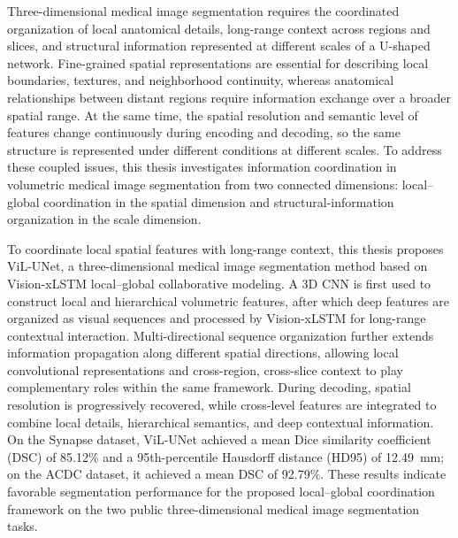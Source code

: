 
Three-dimensional medical image segmentation requires the coordinated organization of local anatomical details, long-range context across regions and slices, and structural information represented at different scales of a U-shaped network. Fine-grained spatial representations are essential for describing local boundaries, textures, and neighborhood continuity, whereas anatomical relationships between distant regions require information exchange over a broader spatial range. At the same time, the spatial resolution and semantic level of features change continuously during encoding and decoding, so the same structure is represented under different conditions at different scales. To address these coupled issues, this thesis investigates information coordination in volumetric medical image segmentation from two connected dimensions: local--global coordination in the spatial dimension and structural-information organization in the scale dimension.

To coordinate local spatial features with long-range context, this thesis proposes ViL-UNet, a three-dimensional medical image segmentation method based on Vision-xLSTM local--global collaborative modeling. A 3D CNN is first used to construct local and hierarchical volumetric features, after which deep features are organized as visual sequences and processed by Vision-xLSTM for long-range contextual interaction. Multi-directional sequence organization further extends information propagation along different spatial directions, allowing local convolutional representations and cross-region, cross-slice context to play complementary roles within the same framework. During decoding, spatial resolution is progressively recovered, while cross-level features are integrated to combine local details, hierarchical semantics, and deep contextual information. On the Synapse dataset, ViL-UNet achieved a mean Dice similarity coefficient (DSC) of 85.12\% and a 95th-percentile Hausdorff distance (HD95) of 12.49~mm; on the ACDC dataset, it achieved a mean DSC of 92.79\%. These results indicate favorable segmentation performance for the proposed local--global coordination framework on the two public three-dimensional medical image segmentation tasks.

